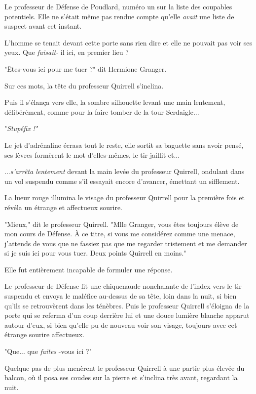 Le professeur de Défense de Poudlard, numéro un sur la liste des coupables potentiels. Elle ne s'était même pas rendue compte qu'elle \emph{avait}  une liste de suspect avant cet instant.

L'homme se tenait devant cette porte sans rien dire et elle ne pouvait pas voir ses yeux. Que \emph{faisait-} il ici, en premier lieu ?

"Êtes-vous ici pour me tuer ?" dit Hermione Granger.

Sur ces mots, la tête du professeur Quirrell s'inclina.

Puis il s'élança vers elle, la sombre silhouette levant une main lentement, délibérément, comme pour la faire tomber de la tour Serdaigle...

"\emph{Stupéfix !"} 

Le jet d'adrénaline écrasa tout le reste, elle sortit sa baguette sans avoir pensé, ses lèvres formèrent le mot d'elles-mêmes, le tir jaillit et...

...\emph{s'arrêta lentement } devant la main levée du professeur Quirrell, ondulant dans un vol suspendu comme s'il essayait encore d'avancer, émettant un sifflement.

La lueur rouge illumina le visage du professeur Quirrell pour la première fois et révéla un étrange et affectueux sourire.

"Mieux," dit le professeur Quirrell. "Mlle Granger, vous êtes toujours élève de mon cours de Défense. À ce titre, si vous me considérez comme une menace, j'attends de vous que ne fassiez pas que me regarder tristement et me demander si je suis ici pour vous tuer. Deux points Quirrell en moins."

Elle fut entièrement incapable de formuler une réponse.

Le professeur de Défense fit une chiquenaude nonchalante de l'index vers le tir suspendu et envoya le maléfice au-dessus de sa tête, loin dans la nuit, si bien qu'ils se retrouvèrent dans les ténèbres. Puis le professeur Quirrell s'éloigna de la porte qui se referma d'un coup derrière lui et une douce lumière blanche apparut autour d'eux, si bien qu'elle pu de nouveau voir son visage, toujours avec cet étrange sourire affectueux.

"Que... que \emph{faites} -vous ici ?"

Quelque pas de plus menèrent le professeur Quirrell à une partie plus élevée du balcon, où il posa ses coudes sur la pierre et s'inclina très avant, regardant la nuit.

